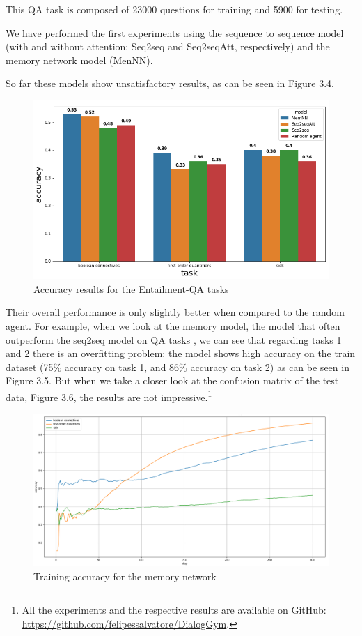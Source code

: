 This QA task is composed of 23000 questions for training and 5900 for testing.

We have performed the first experiments using the sequence to sequence model (with and without attention: Seq2seq and Seq2seqAtt, respectively) and the memory network model (MenNN).

So far these models show unsatisfactory results, as can be seen in Figure 3.4.

\begin{center}
\begin{figure}[h]
\label{EntailQAresults}
\includegraphics[width=13.0cm]{img/comparative_results.png}
\caption{Accuracy results for the Entailment-QA tasks}
\end{figure}
\end{center}

Their overall performance is only slightly better when compared to the random agent. For example, when we look at the memory model, the model that often  outperform the seq2seq model on QA tasks \cite{WestonBCM15}, we can see that regarding tasks 1 and 2 there is an overfitting problem: the model shows high accuracy on the train dataset (75$\%$ accuracy on task 1, and 86$\%$ accuracy on task 2) as can be seen in Figure 3.5. But when we take a closer look at the confusion matrix of the test data, Figure 3.6, the results are not impressive.\footnote{All the experiments and the respective results are available on GitHub: \url{https://github.com/felipessalvatore/DialogGym}.}
  

\begin{center}
\begin{figure}[h]
\includegraphics[width=13.0cm]{img/training_acc_EntailQA_mem.png}
\caption{Training accuracy for the memory network}
\end{figure}
\end{center}


